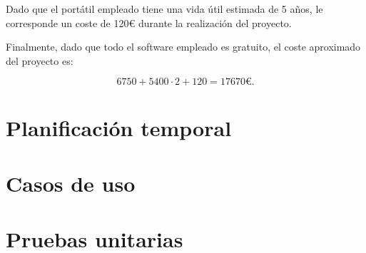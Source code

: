 Dado que el portátil empleado tiene una vida útil estimada de 5 años, le corresponde un coste de 120€ durante la realización del proyecto.

Finalmente, dado que todo el software empleado es gratuito, el coste aproximado del proyecto es:

$$6750+5400\cdot 2+120=17670\text{€}.$$

\section{Planificación temporal}



\section{Casos de uso}



\section{Pruebas unitarias}




